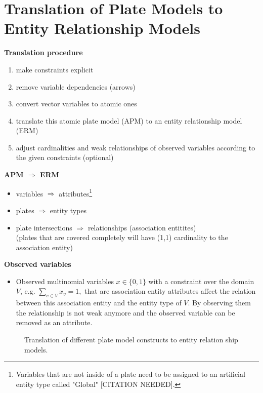 \section{Translation of Plate Models to Entity Relationship Models}

\textbf{Translation procedure}
\begin{enumerate}
\item make constraints explicit
\item remove variable dependencies (arrows)
\item convert vector variables to atomic ones
\item translate this atomic plate model (APM) to an entity relationship model (ERM)
\item adjust cardinalities and weak relationships of observed variables according to the given constraints (optional)
\end{enumerate}

\textbf{APM $\Rightarrow$ ERM}
\begin{itemize}
\item variables $\Rightarrow$ attributes\footnote{Variables that are not inside of a plate need to be assigned to an artificial entity type called "Global" [CITATION NEEDED].}
\item plates $\Rightarrow$ entity types
\item plate intersections $\Rightarrow$ relationships (association entitites)\\
	(plates that are covered completely will have (1,1) cardinality to the association entity)
\end{itemize}

\textbf{Observed variables}
\begin{itemize}
\item Observed multinomial variables $x \in \{0,1\}$ with a constraint over the domain $V$, e.g. $\sum_{v \in V} x_v = 1,$ that are association entity attributes affect the relation between this association entity and the entity type of $V$. By observing them the relationship is not weak anymore and the observed variable can be removed as an attribute.
\end{itemize}

\begin{figure}
\resizebox{1\linewidth}{!}{}
\caption{Translation of different plate model constructs to entity relation ship models.}\label{fig:pm2erm}
\end{figure}
